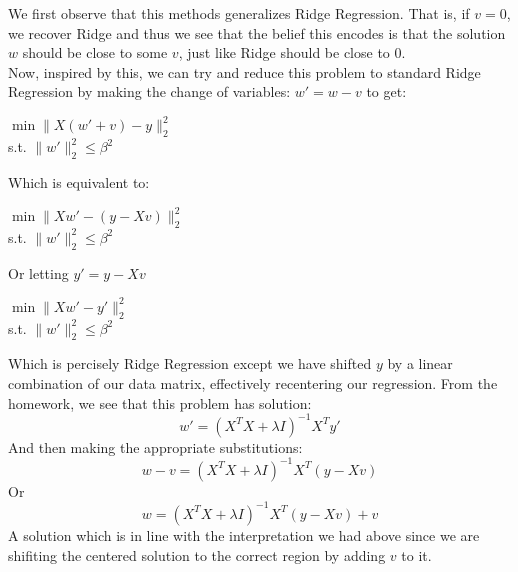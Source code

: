 \begin{Parts}
\begin{solution}
 We first observe that this methods generalizes Ridge Regression. That is, if $v=0$, we recover Ridge and thus we see that the belief this encodes is that the solution $w$ should be close to some $v$, just like Ridge should be close to 0.\\
 Now, inspired by this, we can try and reduce this problem to standard Ridge Regression by making the change of variables: $w' = w - v$ to get:
 \begin{center}
     $\min \|X(w' + v) - y\|_2^2$\\
     s.t. $\|w'\|_2^2 \leq \beta^2$\\
 \end{center}
 Which is equivalent to:
 \begin{center}
     $\min \|Xw' - (y - Xv)\|_2^2$\\
     s.t. $\|w'\|_2^2 \leq \beta^2$\\
 \end{center}
 Or letting $y' = y - Xv$
 \begin{center}
     $\min \|Xw' - y'\|_2^2$\\
     s.t. $\|w'\|_2^2 \leq \beta^2$\\
 \end{center}
 Which is percisely Ridge Regression except we have shifted $y$ by a linear combination of our data matrix, effectively recentering our regression. From the homework, we see that this problem has solution:
 $$w' = (X^TX + \lambda I)^{-1}X^Ty'$$
 And then making the appropriate substitutions:
  $$w - v = (X^TX + \lambda I)^{-1}X^T(y - Xv)$$
Or
  $$w = (X^TX + \lambda I)^{-1}X^T(y - Xv) + v$$
  A solution which is in line with the interpretation we had above since we are shifiting the centered solution to the correct region by adding $v$ to it.

\end{solution}
\end{Parts}
